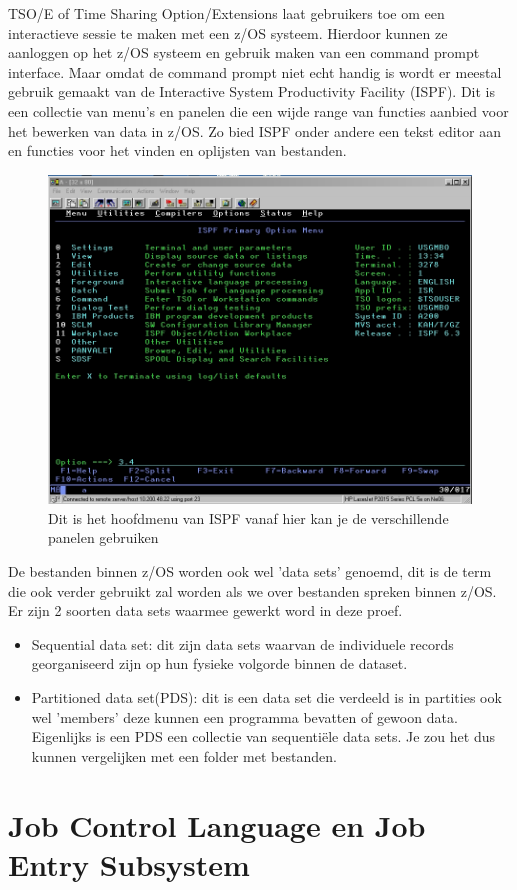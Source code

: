 TSO/E of Time Sharing Option/Extensions laat gebruikers toe om een interactieve sessie te maken met een z/OS systeem. Hierdoor kunnen ze aanloggen op het z/OS systeem en gebruik maken van een command prompt interface. Maar omdat de command prompt niet echt handig is wordt er meestal gebruik gemaakt van de Interactive System Productivity Facility (ISPF). Dit is een collectie van menu's en panelen die een wijde range van functies aanbied voor het bewerken van data in z/OS. Zo bied ISPF onder andere een tekst editor aan en functies voor het vinden en oplijsten van bestanden. \cite{Parziale2017}

\begin{figure}
	\centering
	\includegraphics[width=0.7\linewidth]{img/IPSF}
	\caption[ISPF hoofdmenu]{Dit is het hoofdmenu van ISPF vanaf hier kan je de verschillende panelen gebruiken}
	\label{fig:ispf}
\end{figure}


De bestanden binnen z/OS worden ook wel 'data sets' genoemd, dit is de term die ook verder gebruikt zal worden als we over bestanden spreken binnen z/OS. Er zijn 2 soorten data sets waarmee gewerkt word in deze proef.

\begin{itemize}
	\item Sequential data set: dit zijn data sets waarvan de individuele records georganiseerd zijn op hun fysieke volgorde binnen de dataset.
	\item Partitioned data set(PDS): dit is een data set die verdeeld is in partities ook wel 'members' deze kunnen een programma bevatten of gewoon data. Eigenlijks is een PDS een collectie van sequentiële data sets. Je zou het dus kunnen vergelijken met een folder met bestanden.
\end{itemize}

\section{Job Control Language en Job Entry Subsystem}
\label{sec:Job Control Language en Job Entry Subsystem}

